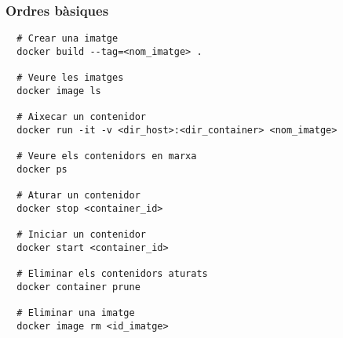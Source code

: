 \begin{frame}[containsverbatim]
  \frametitle{Ordres bàsiques}
  \tiny
  \begin{lstlisting}
  # Crear una imatge
  docker build --tag=<nom_imatge> .
  
  # Veure les imatges
  docker image ls
  
  # Aixecar un contenidor
  docker run -it -v <dir_host>:<dir_container> <nom_imatge>
  
  # Veure els contenidors en marxa
  docker ps
  
  # Aturar un contenidor
  docker stop <container_id>
  
  # Iniciar un contenidor
  docker start <container_id>
  
  # Eliminar els contenidors aturats
  docker container prune
  
  # Eliminar una imatge
  docker image rm <id_imatge>
  
  \end{lstlisting}
\end{frame}
